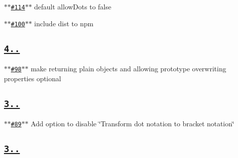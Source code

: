 \begin{DoxyItemize}
\item \href{https://github.com/ljharb/qs/issues/114}{\tt $\ast$$\ast$\#114$\ast$$\ast$} default allow\+Dots to false
\item \href{https://github.com/ljharb/qs/issues/100}{\tt $\ast$$\ast$\#100$\ast$$\ast$} include dist to npm
\end{DoxyItemize}

\subsection*{\href{https://github.com/ljharb/qs/issues?milestone=26&state=closed}{\tt {\bfseries 4..}}}


\begin{DoxyItemize}
\item \href{https://github.com/ljharb/qs/issues/98}{\tt $\ast$$\ast$\#98$\ast$$\ast$} make returning plain objects and allowing prototype overwriting properties optional
\end{DoxyItemize}

\subsection*{\href{https://github.com/ljharb/qs/issues?milestone=24&state=closed}{\tt {\bfseries 3..}}}


\begin{DoxyItemize}
\item \href{https://github.com/ljharb/qs/issues/89}{\tt $\ast$$\ast$\#89$\ast$$\ast$} Add option to disable \char`\"{}\+Transform dot notation to bracket notation\char`\"{}
\end{DoxyItemize}

\subsection*{\href{https://github.com/ljharb/qs/issues?milestone=23&state=closed}{\tt {\bfseries 3..}}}


